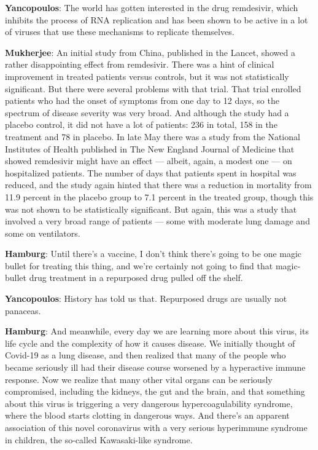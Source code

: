 \textbf{Yancopoulos}: The world has gotten interested in the drug
remdesivir, which inhibits the process of RNA replication and has been
shown to be active in a lot of viruses that use these mechanisms to
replicate themselves.

\textbf{Mukherjee}: An initial study from China, published in the
Lancet, showed a rather disappointing effect from remdesivir. There was
a hint of clinical improvement in treated patients versus controls, but
it was not statistically significant. But there were several problems
with that trial. That trial enrolled patients who had the onset of
symptoms from one day to 12 days, so the spectrum of disease severity
was very broad. And although the study had a placebo control, it did not
have a lot of patients: 236 in total, 158 in the treatment and 78 in
placebo. In late May there was a study from the National Institutes of
Health published in The New England Journal of Medicine that showed
remdesivir might have an effect --- albeit, again, a modest one --- on
hospitalized patients. The number of days that patients spent in
hospital was reduced, and the study again hinted that there was a
reduction in mortality from 11.9 percent in the placebo group to 7.1
percent in the treated group, though this was not shown to be
statistically significant. But again, this was a study that involved a
very broad range of patients --- some with moderate lung damage and some
on ventilators.

\textbf{Hamburg}: Until there's a vaccine, I don't think there's going
to be one magic bullet for treating this thing, and we're certainly not
going to find that magic-bullet drug treatment in a repurposed drug
pulled off the shelf.

\textbf{Yancopoulos}: History has told us that. Repurposed drugs are
usually not panaceas.

\textbf{Hamburg}: And meanwhile, every day we are learning more about
this virus, its life cycle and the complexity of how it causes disease.
We initially thought of Covid-19 as a lung disease, and then realized
that many of the people who became seriously ill had their disease
course worsened by a hyperactive immune response. Now we realize that
many other vital organs can be seriously compromised, including the
kidneys, the gut and the brain, and that something about this virus is
triggering a very dangerous hypercoagulability syndrome, where the blood
starts clotting in dangerous ways. And there's an apparent association
of this novel coronavirus with a very serious hyperimmune syndrome in
children, the so-called Kawasaki-like syndrome.

